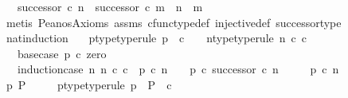 \begin{isabellebody}
\ \ \ {\isachardoublequoteopen}successor\ {\isasymcirc}\isactrlsub c\ n\ {\isacharequal}{\kern0pt}\ successor\ {\isasymcirc}\isactrlsub c\ m\ {\isasymLongrightarrow}\ n\ {\isacharequal}{\kern0pt}\ m{\isachardoublequoteclose}\isanewline
%
\isadelimproof
\ \ %
\endisadelimproof
%
\isatagproof
{}\isamarkupfalse%
\ {\isacharparenleft}{\kern0pt}metis\ Peano{\isacharprime}{\kern0pt}s{\isacharunderscore}{\kern0pt}Axioms\ assms\ cfunc{\isacharunderscore}{\kern0pt}type{\isacharunderscore}{\kern0pt}def\ injective{\isacharunderscore}{\kern0pt}def\ successor{\isacharunderscore}{\kern0pt}type{\isacharparenright}{\kern0pt}%
\endisatagproof
{\isafoldproof}%
%
\isadelimproof
\ \isanewline
%
\endisadelimproof
\isanewline
{}\isamarkupfalse%
\ nat{\isacharunderscore}{\kern0pt}induction{\isacharcolon}{\kern0pt}\isanewline
\ \ \ p{\isacharunderscore}{\kern0pt}type{\isacharbrackleft}{\kern0pt}type{\isacharunderscore}{\kern0pt}rule{\isacharbrackright}{\kern0pt}{\isacharcolon}{\kern0pt}\ {\isachardoublequoteopen}p\ {\isacharcolon}{\kern0pt}\ {\isasymnat}\isactrlsub c\ {\isasymrightarrow}\ {\isasymOmega}{\isachardoublequoteclose}\ \ n{\isacharunderscore}{\kern0pt}type{\isacharbrackleft}{\kern0pt}type{\isacharunderscore}{\kern0pt}rule{\isacharbrackright}{\kern0pt}{\isacharcolon}{\kern0pt}\ {\isachardoublequoteopen}n\ {\isasymin}\isactrlsub c\ {\isasymnat}\isactrlsub c{\isachardoublequoteclose}\isanewline
\ \ \ base{\isacharunderscore}{\kern0pt}case{\isacharcolon}{\kern0pt}\ {\isachardoublequoteopen}p\ {\isasymcirc}\isactrlsub c\ zero\ {\isacharequal}{\kern0pt}\ {\isasymt}{\isachardoublequoteclose}\isanewline
\ \ \ induction{\isacharunderscore}{\kern0pt}case{\isacharcolon}{\kern0pt}\ {\isachardoublequoteopen}{\isasymAnd}n{\isachardot}{\kern0pt}\ n\ {\isasymin}\isactrlsub c\ {\isasymnat}\isactrlsub c\ {\isasymLongrightarrow}\ p\ {\isasymcirc}\isactrlsub c\ n\ {\isacharequal}{\kern0pt}\ {\isasymt}\ {\isasymLongrightarrow}\ p\ {\isasymcirc}\isactrlsub c\ successor\ {\isasymcirc}\isactrlsub c\ n\ {\isacharequal}{\kern0pt}\ {\isasymt}{\isachardoublequoteclose}\isanewline
\ \ \ {\isachardoublequoteopen}p\ {\isasymcirc}\isactrlsub c\ n\ {\isacharequal}{\kern0pt}\ {\isasymt}{\isachardoublequoteclose}\isanewline
%
\isadelimproof
%
\endisadelimproof
%
\isatagproof
{}\isamarkupfalse%
\ {\isacharminus}{\kern0pt}\isanewline
\ \ \isamarkupfalse%
\ p{\isacharprime}{\kern0pt}\ P\ \isanewline
\ \ \ \ p{\isacharprime}{\kern0pt}{\isacharunderscore}{\kern0pt}type{\isacharbrackleft}{\kern0pt}type{\isacharunderscore}{\kern0pt}rule{\isacharbrackright}{\kern0pt}{\isacharcolon}{\kern0pt}\ {\isachardoublequoteopen}p{\isacharprime}{\kern0pt}\ {\isacharcolon}{\kern0pt}\ P\ {\isasymrightarrow}\ {\isasymnat}\isactrlsub c{\isachardoublequoteclose}\ \isanewline

\end{isabellebody}
